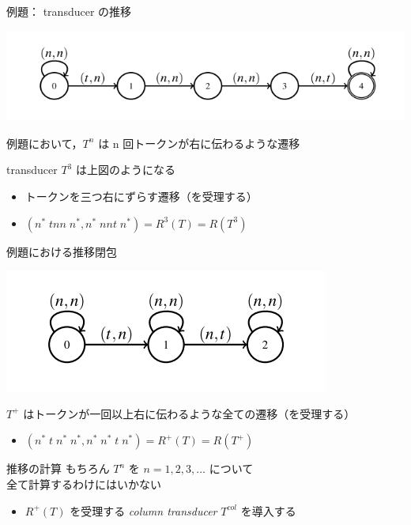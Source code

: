 \documentclass[presentation, xetex]{beamer}
\begin{document}
\begin{frame}[label={sec:orgc84b8b9}]{例題： transducer の推移}
\begin{center}
\includegraphics[width=.9\linewidth]{./images/3-transducer.png}
\end{center}

例題において，\(T^n\) は n 回トークンが右に伝わるような遷移

transducer \(T^3\) は上図のようになる
\begin{itemize}
\item トークンを三つ右にずらす遷移（を受理する）
\item \((n^* \; tnn \; n^*, n^* \; nnt \; n^*) = R^3(T) = R(T^3)\)
\end{itemize}
\end{frame}



\begin{frame}[label={sec:org401e06c}]{例題における推移閉包}
\begin{center}
\includegraphics[width=.9\linewidth]{./images/n-transitive-transducer.png}
\end{center}

\(T^+\) はトークンが一回以上右に伝わるような全ての遷移（を受理する）
\begin{itemize}
\item \((n^* \; t \; n^* \; n^* , n^* \; n^* \; t \; n^*) = R^+(T) = R(T^+)\)
\end{itemize}
\end{frame}



\begin{frame}[label={sec:orgcfc0548}]{推移の計算}
もちろん \(T^n\) を \(n = 1, 2, 3, \dots\) について \\
全て計算するわけにはいかない
\begin{itemize}
\item \(R^+(T)\) を受理する \emph{column transducer} \(T^{col}\) を導入する
\end{itemize}
\end{frame}
\end{document}
